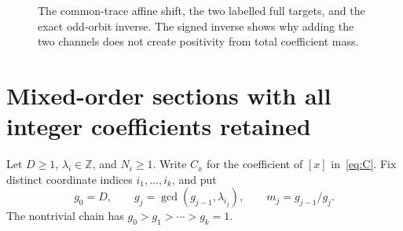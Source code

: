 \begin{figure}[ht]
\centering

\caption{The common-trace affine shift, the two labelled full targets, and the
exact odd-orbit inverse. The signed inverse shows why adding the two channels
does not create positivity from total coefficient mass.}
\label{fig:affine-channel}
\end{figure}

\section{Mixed-order sections with all integer coefficients retained}
Let $D\ge1$, $\lambda_i\in\mathbb Z$, and $N_i\ge1$. Write $C_x$ for the
coefficient of $[x]$ in~\eqref{eq:C}. Fix distinct coordinate indices
$i_1,\ldots,i_k$, and put
\[
 g_0=D,\qquad g_j=\gcd(g_{j-1},\lambda_{i_j}),\qquad
 m_j=g_{j-1}/g_j.
\]
The nontrivial chain has $g_0>g_1>\cdots>g_k=1$.

